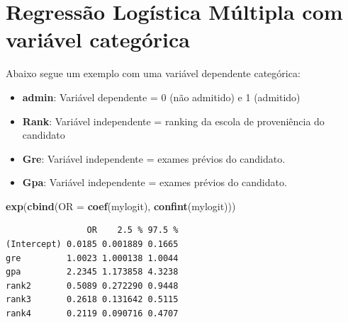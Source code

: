 \documentclass[12pt,brazil,oneside]{book}
\newenvironment{Shaded}{\begin{snugshade}}{\end{snugshade}}
\newcommand{\DataTypeTok}[1]{\textcolor[rgb]{0.13,0.29,0.53}{#1}}
\newcommand{\KeywordTok}[1]{\textcolor[rgb]{0.13,0.29,0.53}{\textbf{#1}}}
\newcommand{\NormalTok}[1]{#1}
\newcommand{\OperatorTok}[1]{\textcolor[rgb]{0.81,0.36,0.00}{\textbf{#1}}}
\newcommand{\StringTok}[1]{\textcolor[rgb]{0.31,0.60,0.02}{#1}}
\providecommand{\tightlist}{%
  \setlength{\itemsep}{0pt}\setlength{\parskip}{0pt}}
\begin{document}
\hypertarget{regressao-logistica-multipla-com-variavel-categorica}{%
\section{Regressão Logística Múltipla com variável
categórica}\label{regressao-logistica-multipla-com-variavel-categorica}}

Abaixo segue um exemplo com uma variável dependente categórica:

\begin{itemize}
\tightlist
\item
  \textbf{admin}: Variável dependente = 0 (não admitido) e 1 (admitido)
\item
  \textbf{Rank}: Variável independente = ranking da escola de
  proveniência do candidato
\item
  \textbf{Gre}: Variável independente = exames prévios do candidato.
\item
  \textbf{Gpa}: Variável independente = exames prévios do candidato.
\end{itemize}

\begin{Shaded}
\end{Shaded}

\begin{Shaded}
\begin{Highlighting}[]
\KeywordTok{exp}\NormalTok{(}\KeywordTok{cbind}\NormalTok{(}\DataTypeTok{OR =} \KeywordTok{coef}\NormalTok{(mylogit), }\KeywordTok{confint}\NormalTok{(mylogit)))}
\end{Highlighting}
\end{Shaded}

\begin{verbatim}
                OR    2.5 % 97.5 %
(Intercept) 0.0185 0.001889 0.1665
gre         1.0023 1.000138 1.0044
gpa         2.2345 1.173858 4.3238
rank2       0.5089 0.272290 0.9448
rank3       0.2618 0.131642 0.5115
rank4       0.2119 0.090716 0.4707
\end{verbatim}
\end{document}
